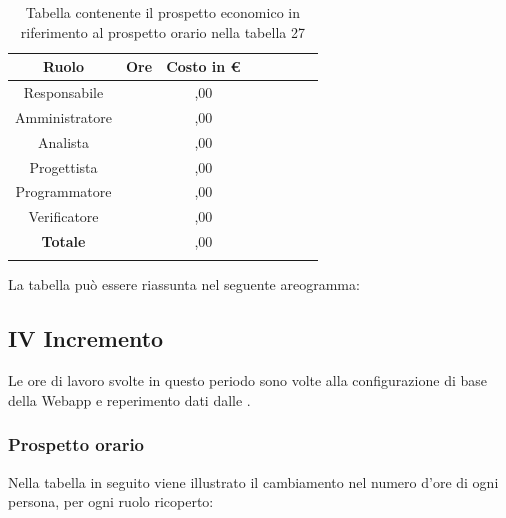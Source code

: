 			\begin{longtable}{|c|c|c|c|c|c|c|c}
				\hline
				\rowcolor{lighter-grayer}
				\textbf{Ruolo} & \textbf{Ore} & \textbf{Costo in €} \\
				\hline
				\endfirsthead
				\hline
			Responsabile 	    &  & ,00\\
			\hline 
			\hline
			Amministratore	  &  & ,00\\
			\hline
			\hline
			Analista 				&  & ,00\\
			\hline
			\hline
			Progettista 		  &  & ,00\\
			\hline
			\hline
			Programmatore 	 &  & ,00\\
			\hline
			\hline
			Verificatore 		  &  & ,00\\
			\hline
			\textbf{Totale} 	&  & ,00\\
			\hline 
				
				\caption{Tabella contenente il prospetto economico in riferimento al prospetto orario nella tabella 27}
			\end{longtable}
			\pagebreak
			
			La tabella può essere riassunta nel seguente areogramma:

		
		\subsection{IV Incremento}
		Le ore di lavoro svolte in questo periodo sono volte alla configurazione di base della Webapp e reperimento dati dalle .
		\subsubsection{Prospetto orario}
			Nella tabella in seguito viene illustrato il cambiamento nel numero d'ore di ogni persona, per ogni ruolo ricoperto:
			
